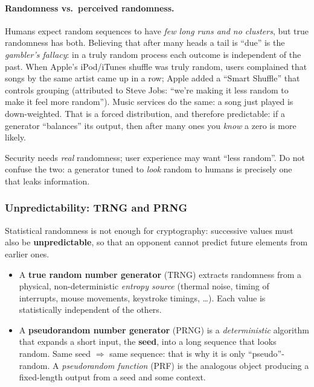 \paragraph{Randomness vs.\ perceived randomness.} Humans expect random sequences to have \emph{few long runs and no clusters}, but true randomness has both. Believing that after many heads a tail is \enquote{due} is the \emph{gambler's fallacy}: in a truly random process each outcome is independent of the past. When Apple's iPod/iTunes shuffle was truly random, users complained that songs by the same artist came up in a row; Apple added a \enquote{Smart Shuffle} that controls grouping (attributed to Steve Jobs: \enquote{we're making it less random to make it feel more random}). Music services do the same: a song just played is down-weighted. That is a forced distribution, and therefore predictable: if a generator \enquote{balances} its output, then after many ones you \emph{know} a zero is more likely.

\begin{remark}
Security needs \emph{real} randomness; user experience may want \enquote{less random}. Do not confuse the two: a generator tuned to \emph{look} random to humans is precisely one that leaks information.
\end{remark}

\subsubsection{Unpredictability: TRNG and PRNG}

Statistical randomness is not enough for cryptography: successive values must also be \textbf{unpredictable}, so that an opponent cannot predict future elements from earlier ones.

\begin{definition}
\leavevmode
\begin{itemize}
    \item A \textbf{true random number generator} (TRNG) extracts randomness from a physical, non-deterministic \emph{entropy source} (thermal noise, timing of interrupts, mouse movements, keystroke timings, \dots). Each value is statistically independent of the others.
    \item A \textbf{pseudorandom number generator} (PRNG) is a \emph{deterministic} algorithm that expands a short input, the \textbf{seed}, into a long sequence that looks random. Same seed $\Rightarrow$ same sequence: that is why it is only \enquote{pseudo}-random. A \emph{pseudorandom function} (PRF) is the analogous object producing a fixed-length output from a seed and some context.
\end{itemize}
\end{definition}

